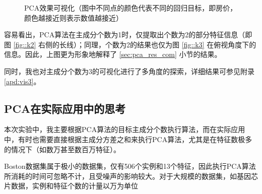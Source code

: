 \documentclass[12pt,a4paper]{article}
\theoremstyle{definition}
\begin{document}
\begin{figure}[H]
	\centering
	\caption{PCA效果可视化（图中不同点的颜色代表不同的回归目标，即房价，颜色越接近则表示数值越接近）}
	\label{fig:pca_vis}
\end{figure}

容易看出，PCA算法在主成分个数为1时，仅提取出个数为2的部分特征信息（即图 \ref{fig::k2} 右侧的长线）；同理，个数为2的结果也仅为图 \ref{fig::k3} 在俯视角度下的信息。因此，上图更为形象地解释了 \ref{sec:pca_res_com} 小节的结果。

同时，我也对主成分个数为3的可视化进行了多角度的探索，详细结果可参见附录 \ref{apd:vis3}。

\subsection{PCA在实际应用中的思考}
\label{sec:dis}

本次实验中，我主要根据PCA算法的目标主成分个数执行算法，而在实际应用中，有时也需要直接根据主成分方差之和来执行PCA算法，尤其是在特征数极多的情况下（如数万甚至数百万特征）。

Boston数据集属于极小的数据集，仅有506个实例和13个特征，因此执行PCA算法所消耗的时间可忽略不计，且受噪声的影响较大。对于大规模的数据集，如基因芯片数据，实例和特征个数的计量以万为单位
\end{document}
